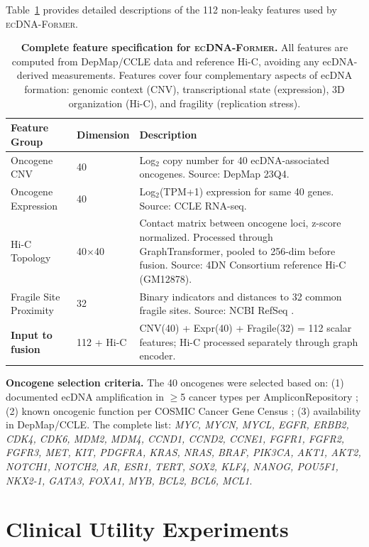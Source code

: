 \documentclass{article}
\newcommand{\former}{\textsc{ecDNA-Former}}
\begin{document}
Table~\ref{tab:feature_details} provides detailed descriptions of the 112 non-leaky features used by \former{}.

\begin{table}[ht]
\caption{\textbf{Complete feature specification for \former{}.} All features are computed from DepMap/CCLE data and reference Hi-C, avoiding any ecDNA-derived measurements. Features cover four complementary aspects of ecDNA formation: genomic context (CNV), transcriptional state (expression), 3D organization (Hi-C), and fragility (replication stress).}
\label{tab:feature_details}
\centering
\small
\begin{tabular}{@{}p{2.5cm}p{1.5cm}p{6cm}@{}}
\toprule
Feature Group & Dimension & Description \\
\midrule
Oncogene CNV & 40 & Log$_2$ copy number for 40 ecDNA-associated oncogenes. Source: DepMap 23Q4. \\
Oncogene Expression & 40 & Log$_2$(TPM+1) expression for same 40 genes. Source: CCLE RNA-seq. \\
Hi-C Topology & 40$\times$40 & Contact matrix between oncogene loci, z-score normalized. Processed through GraphTransformer, pooled to 256-dim before fusion. Source: 4DN Consortium \citep{4dn_2017} reference Hi-C (GM12878). \\
Fragile Site Proximity & 32 & Binary indicators and distances to 32 common fragile sites. Source: NCBI RefSeq \citep{refseq_2016}. \\
\midrule
\textbf{Input to fusion} & 112 + Hi-C & CNV(40) + Expr(40) + Fragile(32) = 112 scalar features; Hi-C processed separately through graph encoder. \\
\bottomrule
\end{tabular}
\end{table}

\textbf{Oncogene selection criteria.} The 40 oncogenes were selected based on: (1) documented ecDNA amplification in $\geq$5 cancer types per AmpliconRepository \citep{luebeck_2020_ampliconreconstructor}; (2) known oncogenic function per COSMIC Cancer Gene Census \citep{cosmic_2019}; (3) availability in DepMap/CCLE. The complete list: \textit{MYC, MYCN, MYCL, EGFR, ERBB2, CDK4, CDK6, MDM2, MDM4, CCND1, CCND2, CCNE1, FGFR1, FGFR2, FGFR3, MET, KIT, PDGFRA, KRAS, NRAS, BRAF, PIK3CA, AKT1, AKT2, NOTCH1, NOTCH2, AR, ESR1, TERT, SOX2, KLF4, NANOG, POU5F1, NKX2-1, GATA3, FOXA1, MYB, BCL2, BCL6, MCL1}.


\section{Clinical Utility Experiments}
\label{app:utility}
\end{document}
